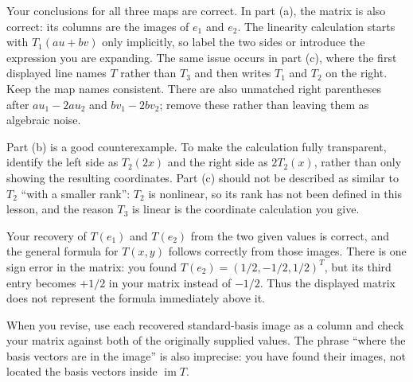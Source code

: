 \begin{feedback}[\cref{ex:la-7}]
Your conclusions for all three maps are correct. In part (a), the matrix
is also correct: its columns are the images of $e_1$ and $e_2$. The
linearity calculation starts with $T_1(au+bv)$ only implicitly, so label
the two sides or introduce the expression you are expanding. The same
issue occurs in part (c), where the first displayed line names $T$ rather
than $T_3$ and then writes $T_1$ and $T_2$ on the right. Keep the map
names consistent. There are also unmatched right parentheses after
$au_1-2au_2$ and $bv_1-2bv_2$; remove these rather than leaving them as
algebraic noise.

Part (b) is a good counterexample. To make the calculation fully
transparent, identify the left side as $T_2(2x)$ and the right side as
$2T_2(x)$, rather than only showing the resulting coordinates. Part (c)
should not be described as similar to $T_2$ ``with a smaller rank'': $T_2$
is nonlinear, so its rank has not been defined in this lesson, and the
reason $T_3$ is linear is the coordinate calculation you give.
\end{feedback}

\begin{feedback}[\cref{ex:la-8}]
Your recovery of $T(e_1)$ and $T(e_2)$ from the two given values is
correct, and the general formula for $T(x,y)$ follows correctly from
those images. There is one sign error in the matrix: you found
$T(e_2)=(1/2,-1/2,1/2)^T$, but its third entry becomes $+1/2$ in your
matrix instead of $-1/2$. Thus the displayed matrix does not represent
the formula immediately above it.

When you revise, use each recovered standard-basis image as a column and
check your matrix against both of the originally supplied values. The
phrase ``where the basis vectors are in the image'' is also imprecise:
you have found their images, not located the basis vectors inside
$\operatorname{im}T$.
\end{feedback}

